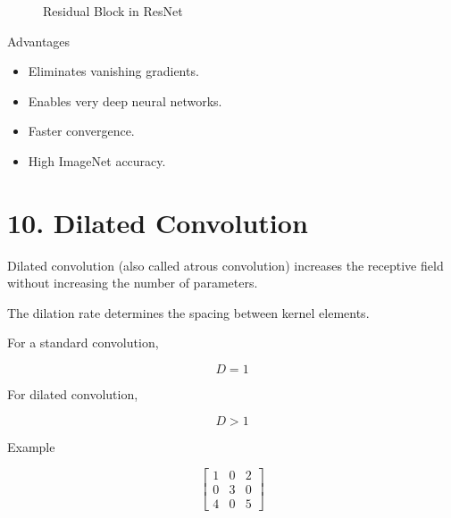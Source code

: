 \documentclass[11pt]{article}
\begin{document}
\begin{figure}[H]
\centering


\caption{Residual Block in ResNet}
\end{figure}

Advantages

\begin{itemize}
\item Eliminates vanishing gradients.
\item Enables very deep neural networks.
\item Faster convergence.
\item High ImageNet accuracy.
\end{itemize}


\section*{10. Dilated Convolution}

Dilated convolution (also called atrous convolution) increases the
receptive field without increasing the number of parameters.

The dilation rate determines the spacing between kernel elements.

For a standard convolution,

\[
D=1
\]

For dilated convolution,

\[
D>1
\]

Example

\[
\begin{bmatrix}
1 & 0 & 2\\
0 & 3 & 0\\
4 & 0 & 5
\end{bmatrix}
\]
\end{document}

